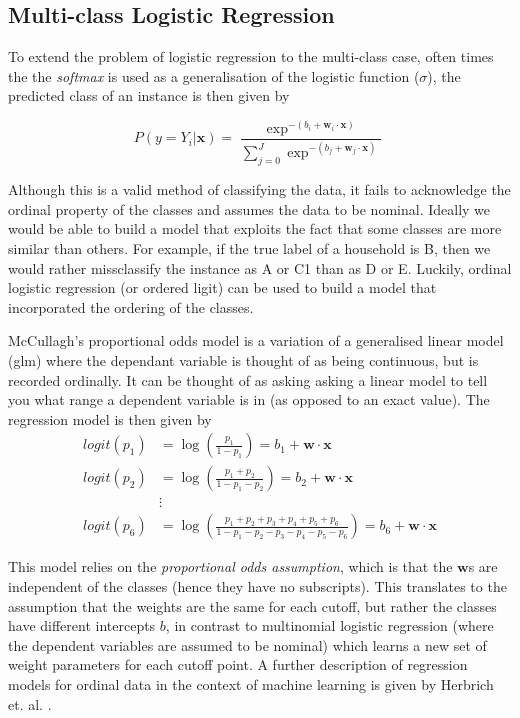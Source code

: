 \subsection{Multi-class Logistic Regression}

To extend the problem of logistic regression to the multi-class case, often times the the \textit{softmax} is used as a generalisation of the logistic function ($\sigma$), the predicted class of an instance is then given by

\[P(y=Y_i|\textbf{x})=\frac{\exp^{-(b_i+\textbf{w}_i\cdot{\textbf{x}})}}{\sum_{j=0}^J\exp^{-(b_j+\textbf{w}_j\cdot{\textbf{x}})}}\]

Although this is a valid method of classifying the data, it fails to acknowledge the ordinal property of the classes and assumes the data to be nominal. Ideally we would be able to build a model that exploits the fact that some classes are more similar than others. For example, if the true label of a household is B, then we would rather missclassify the instance as A or C1 than as D or E. Luckily, ordinal logistic regression (or ordered ligit) can be used to build a model that incorporated the ordering of the classes.

McCullagh's proportional odds model \cite{McCullagh} is a variation of a generalised linear model (glm) where the dependant variable is thought of as being continuous, but is recorded ordinally. It can be thought of as asking asking a linear model to tell you what range a dependent variable is in (as opposed to an exact value). The regression model is then given by 
\begin{align*}
logit(p_1) &=\log(\frac{p_1}{1-p_1}) = b_1 +\textbf{w}\cdot{\textbf{x}} \\
logit(p_2) &=\log(\frac{p_1+p_2}{1-p_1-p_2}) = b_2 +\textbf{w}\cdot{\textbf{x}}\\
&\vdots \\
logit(p_6) &=\log(\frac{p_1+p_2+p_3+p_4+p_5+p_6}{1-p_1-p_2-p_3-p_4-p_5-p_6}) = b_6 +\textbf{w}\cdot{\textbf{x}}
\end{align*}

This model relies on the \textit{proportional odds assumption}, which is that the $\textbf{w}$s are independent of the classes (hence they have no subscripts). This translates to the assumption that the weights are the same for each cutoff, but rather the classes have different intercepts $b$, in contrast to multinomial logistic regression (where the dependent variables are assumed to be nominal) which learns a new set of weight parameters for each cutoff point. A further description of regression models for ordinal data in the context of machine learning is given by Herbrich et. al. \cite{Herbrich}.

